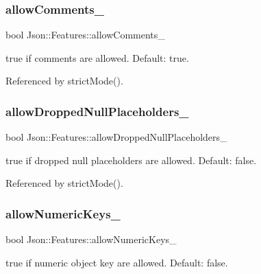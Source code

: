 \subsubsection{\texorpdfstring{allow\+Comments\+\_\+}{allowComments\_}}
{\footnotesize\ttfamily bool Json\+::\+Features\+::allow\+Comments\+\_\+}



{\ttfamily true} if comments are allowed. Default\+: {\ttfamily true}. 



Referenced by strict\+Mode().

\mbox{\label{classJson_1_1Features_a5076aa72c05c7596ac339ede36c97a6a_a5076aa72c05c7596ac339ede36c97a6a}} 
\subsubsection{\texorpdfstring{allow\+Dropped\+Null\+Placeholders\+\_\+}{allowDroppedNullPlaceholders\_}}
{\footnotesize\ttfamily bool Json\+::\+Features\+::allow\+Dropped\+Null\+Placeholders\+\_\+}



{\ttfamily true} if dropped null placeholders are allowed. Default\+: {\ttfamily false}. 



Referenced by strict\+Mode().

\mbox{\label{classJson_1_1Features_aff3cb16b79d15d3d761b11a0dd6d4d6b_aff3cb16b79d15d3d761b11a0dd6d4d6b}} 
\subsubsection{\texorpdfstring{allow\+Numeric\+Keys\+\_\+}{allowNumericKeys\_}}
{\footnotesize\ttfamily bool Json\+::\+Features\+::allow\+Numeric\+Keys\+\_\+}



{\ttfamily true} if numeric object key are allowed. Default\+: {\ttfamily false}. 



